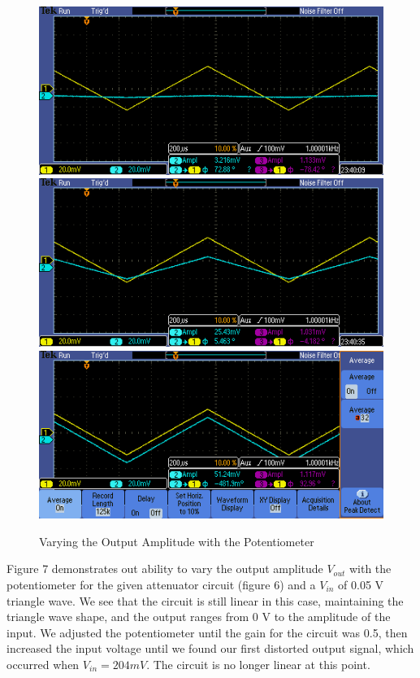 \documentclass{article}
\begin{document}
    \begin{figure}[H]
        \centering
        \includegraphics[scale = 0.5]{TEK00000.PNG}
        \includegraphics[scale = 0.5]{TEK00001.PNG}
        \includegraphics[scale = 0.5]{tek00002.PNG}
        \caption{Varying the Output Amplitude with the Potentiometer}
        \label{fig:my_label}
    \end{figure}
    Figure 7 demonstrates out ability to vary the output amplitude $V_{out}$ with the potentiometer for the given attenuator circuit (figure 6) and a $V_{in}$ of 0.05 V triangle wave. We see that the circuit is still linear in this case, maintaining the triangle wave shape, and the output ranges from 0 V to the amplitude of the input. We adjusted the potentiometer until the gain for the circuit was 0.5, then increased the input voltage until we found our first distorted output signal, which occurred when $V_{in} = 204 mV$. The circuit is no longer linear at this point. 
    
\end{document}
